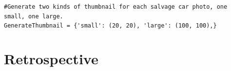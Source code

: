 \documentclass[onecolumn, draftclsnofoot,10pt, compsoc]{IEEEtran}
\begin{document}
\begin{verbatim}
#Generate two kinds of thumbnail for each salvage car photo, one small, one large.
GenerateThumbnail = {'small': (20, 20), 'large': (100, 100),}

\end{verbatim}




\section{Retrospective}
\end{document}
